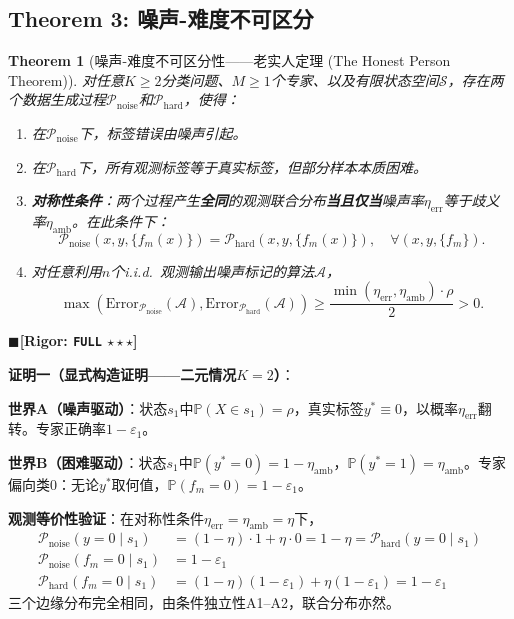 \documentclass[12pt,a4paper]{ctexart}
\newtheorem{theorem}{Theorem}[section]
\theoremstyle{definition}
\theoremstyle{remark}
\newcommand{\rigorFull}{$\blacksquare$\;\textbf{[Rigor: \texttt{FULL} $\star\star\star$]}}
\begin{document}
\subsection{Theorem 3: 噪声-难度不可区分}

\begin{theorem}[噪声-难度不可区分性——老实人定理 (The Honest Person Theorem)]
\label{thm:3}
对任意$K \geq 2$分类问题、$M \geq 1$个专家、以及有限状态空间$\mathcal{S}$，存在两个数据生成过程$\mathcal{P}_{\text{noise}}$和$\mathcal{P}_{\text{hard}}$，使得：
\begin{enumerate}[label=(\roman*)]
\item 在$\mathcal{P}_{\text{noise}}$下，标签错误由噪声引起。
\item 在$\mathcal{P}_{\text{hard}}$下，所有观测标签等于真实标签，但部分样本本质困难。
\item \textbf{对称性条件}：两个过程产生\textbf{全同}的观测联合分布\textbf{当且仅当}噪声率$\eta_{\text{err}}$等于歧义率$\eta_{\text{amb}}$。在此条件下：
\begin{equation}
\mathcal{P}_{\text{noise}}(x, y, \{f_m(x)\}) = \mathcal{P}_{\text{hard}}(x, y, \{f_m(x)\}), \quad \forall (x, y, \{f_m\}).
\end{equation}
\item 对任意利用$n$个i.i.d.\ 观测输出噪声标记的算法$\mathcal{A}$，
\begin{equation}
\max(\mathrm{Error}_{\mathcal{P}_{\text{noise}}}(\mathcal{A}), \mathrm{Error}_{\mathcal{P}_{\text{hard}}}(\mathcal{A})) \geq \frac{\min(\eta_{\text{err}}, \eta_{\text{amb}}) \cdot \rho}{2} > 0.
\end{equation}
\end{enumerate}
\end{theorem}
\rigorFull

\textbf{证明一（显式构造证明——二元情况$K=2$）}：

\textbf{世界A（噪声驱动）}：状态$s_1$中$\mathbb{P}(X\in s_1)=\rho$，真实标签$y^*\equiv0$，以概率$\eta_{\text{err}}$翻转。专家正确率$1-\varepsilon_1$。

\textbf{世界B（困难驱动）}：状态$s_1$中$\mathbb{P}(y^*=0)=1-\eta_{\text{amb}}$，$\mathbb{P}(y^*=1)=\eta_{\text{amb}}$。专家偏向类0：无论$y^*$取何值，$\mathbb{P}(f_m=0)=1-\varepsilon_1$。

\textbf{观测等价性验证}：在对称性条件$\eta_{\text{err}}=\eta_{\text{amb}}=\eta$下，
\begin{align}
\mathcal{P}_{\text{noise}}(y=0\mid s_1) &= (1-\eta)\cdot1 + \eta\cdot0 = 1-\eta = \mathcal{P}_{\text{hard}}(y=0\mid s_1) \\
\mathcal{P}_{\text{noise}}(f_m=0\mid s_1) &= 1-\varepsilon_1 \nonumber\\
\mathcal{P}_{\text{hard}}(f_m=0\mid s_1) &= (1-\eta)(1-\varepsilon_1) + \eta(1-\varepsilon_1) = 1-\varepsilon_1 \nonumber
\end{align}
三个边缘分布完全相同，由条件独立性A1--A2，联合分布亦然。
\end{document}
